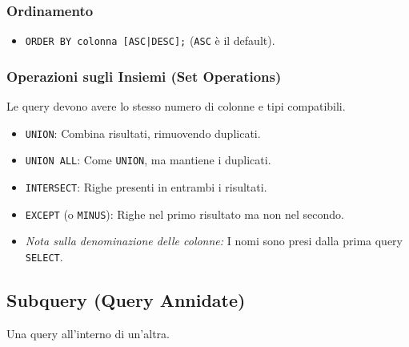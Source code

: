 	\subsubsection{Ordinamento}
	\begin{itemize}
		\item \texttt{ORDER BY colonna [ASC|DESC];} (\texttt{ASC} è il default).
	\end{itemize}
	
	\subsubsection{Operazioni sugli Insiemi (Set Operations)}
	Le query devono avere lo stesso numero di colonne e tipi compatibili.
	\begin{itemize}
		\item \texttt{UNION}: Combina risultati, rimuovendo duplicati.
		\item \texttt{UNION ALL}: Come \texttt{UNION}, ma mantiene i duplicati.
		\item \texttt{INTERSECT}: Righe presenti in entrambi i risultati.
		\item \texttt{EXCEPT} (o \texttt{MINUS}): Righe nel primo risultato ma non nel secondo.
		\item \textit{Nota sulla denominazione delle colonne:} I nomi sono presi dalla prima query \texttt{SELECT}.
	\end{itemize}
	
	\subsection{Subquery (Query Annidate)}
	Una query all'interno di un'altra.
	

